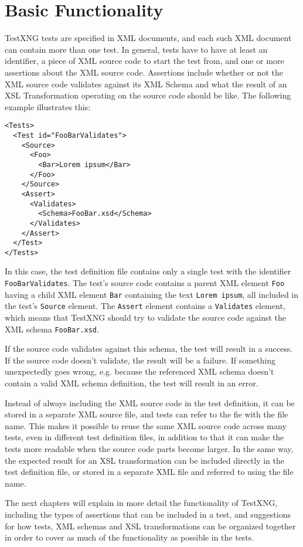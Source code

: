 %

\chapter{Basic Functionality}

TestXNG tests are specified in XML documents, and each such XML document can contain more than one test. In general, tests have to have at least an identifier, a piece of XML source code to start the test from, and one or more assertions about the XML source code. Assertions include whether or not the XML source code validates against its XML Schema and what the result of an XSL Transformation operating on the source code should be like. The following example illustrates this:
\begin{verbatim}
<Tests>
  <Test id="FooBarValidates">
    <Source>
      <Foo>
        <Bar>Lorem ipsum</Bar>
      </Foo>
    </Source>
    <Assert>
      <Validates>
        <Schema>FooBar.xsd</Schema>
      </Validates>
    </Assert>
  </Test>
</Tests>
\end{verbatim}
In this case, the test definition file contains only a single test with the identifier {\tt FooBarValidates}. The test's source code contains a parent XML element {\tt Foo} having a child XML element {\tt Bar} containing the text {\tt Lorem ipsum}, all included in the test's {\tt Source} element. The {\tt Assert} element contains a {\tt Validates} element, which means that TestXNG should try to validate the source code against the XML schema {\tt FooBar.xsd}.

If the source code validates against this schema, the test will result in a success. If the source code doesn't validate, the result will be a failure. If something unexpectedly goes wrong, e.g. because the referenced XML schema doesn't contain a valid XML schema definition, the test will result in an error.

Instead of always including the XML source code in the test definition, it can be stored in a separate XML source file, and tests can refer to the fie with the file name. This makes it possible to reuse the same XML source code across many tests, even in different test definition files, in addition to that it can make the tests more readable when the source code parts become larger. In the same way, the expected result for an XSL transformation can be included directly in the test definition file, or stored in a separate XML file and referred to using the file name.

The next chapters will explain in more detail the functionality of TestXNG, including the types of assertions that can be included in a test, and suggestions for how tests, XML schemas and XSL transformations can be organized together in order to cover as much of the functionality as possible in the tests.

